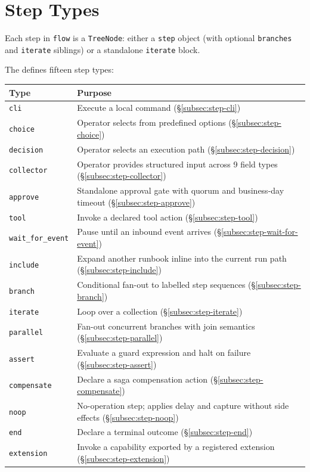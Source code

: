 \section{Step Types}
\label{sec:step-types}

Each step in \texttt{flow} is a \texttt{TreeNode}: either a \texttt{step} object
(with optional \texttt{branches} and \texttt{iterate} siblings) or a standalone
\texttt{iterate} block.

The defines fifteen step types:

\begin{center}
\begin{tabular}{lp{8cm}}
\hline
\textbf{Type} & \textbf{Purpose} \\
\hline
\texttt{cli}              & Execute a local command (\S\ref{subsec:step-cli}) \\
\texttt{choice}           & Operator selects from predefined options (\S\ref{subsec:step-choice}) \\
\texttt{decision}         & Operator selects an execution path (\S\ref{subsec:step-decision}) \\
\texttt{collector}        & Operator provides structured input across 9 field types (\S\ref{subsec:step-collector}) \\
\texttt{approve}          & Standalone approval gate with quorum and business-day timeout (\S\ref{subsec:step-approve}) \\
\texttt{tool}             & Invoke a declared tool action (\S\ref{subsec:step-tool}) \\
\texttt{wait\_for\_event} & Pause until an inbound event arrives (\S\ref{subsec:step-wait-for-event}) \\
\texttt{include}          & Expand another runbook inline into the current run path (\S\ref{subsec:step-include}) \\
\texttt{branch}           & Conditional fan-out to labelled step sequences (\S\ref{subsec:step-branch}) \\
\texttt{iterate}          & Loop over a collection (\S\ref{subsec:step-iterate}) \\
\texttt{parallel}         & Fan-out concurrent branches with join semantics (\S\ref{subsec:step-parallel}) \\
\texttt{assert}           & Evaluate a guard expression and halt on failure (\S\ref{subsec:step-assert}) \\
\texttt{compensate}       & Declare a saga compensation action (\S\ref{subsec:step-compensate}) \\
\texttt{noop}             & No-operation step; applies delay and capture without side effects (\S\ref{subsec:step-noop}) \\
\texttt{end}              & Declare a terminal outcome (\S\ref{subsec:step-end}) \\
\texttt{extension}        & Invoke a capability exported by a registered extension (\S\ref{subsec:step-extension}) \\
\hline
\end{tabular}
\end{center}

